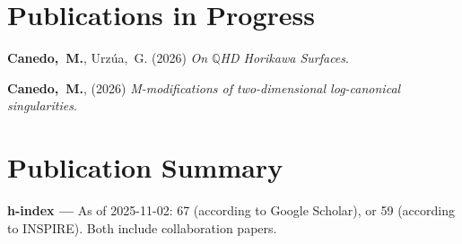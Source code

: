\newcommand{\arxiv}[1]{[\href{http://arxiv.org/abs/#1}{arXiv:#1}]}
\def\zero{0}
\def\one{1}
\newcommand{\citeCount}[1]{%
  \def\val{#1}
  \ifx\val\zero%
  \else%
    \ifx\val\one%
    (1~citation)%
    \else%
    (#1~citations)%
    \fi%
  \fi}

\renewcommand{\citeCount}[1]{}


\setcounter{numPubs}{4}
\setcounter{pubCounter}{\value{numPubs}}

\section{Publications in Progress}
\secstartswithlist{}%
\begin{etaremune}[start=\value{pubCounter}]
\item
   {\bf Canedo,~M.},
   Urzúa,~G.
   (2026)
   {\it On $\mathbb{Q}$HD Horikawa Surfaces}.
   \setcounter{pubCounter}{\value{enumi}}

\item
   {\bf Canedo,~M.},
   (2026)
   {\it M-modifications of two-dimensional log-canonical singularities}.
   \setcounter{pubCounter}{\value{enumi}}
\end{etaremune}

\newif\ifshowpubsummary
\ifshowpubsummary
\section{Publication Summary}
{\bf h-index ---}%
As of 2025-11-02: 67 (according to Google Scholar), or 59 (according
to INSPIRE).  Both include collaboration papers.

